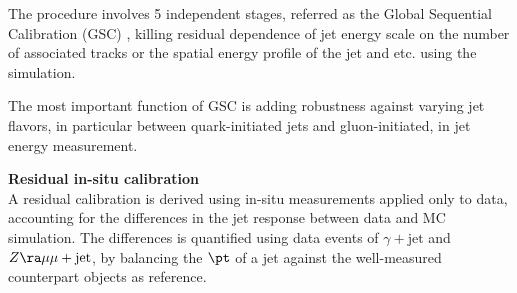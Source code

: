\begin{description}
The procedure involves 5 independent stages, referred as the Global Sequential Calibration (GSC) \cite{140_jetEneMeas_TCcalib}, killing residual dependence of jet energy scale on the number of associated tracks or the spatial energy profile of the jet and etc. using the simulation. 

The most important function of GSC is adding robustness against varying jet flavors, in particular between quark-initiated jets and gluon-initiated, in jet energy measurement.






\item \textbf{Residual in-situ calibration} \\
A residual calibration is derived using in-situ measurements applied only to data, accounting for the differences in the jet response between data and MC simulation.
The differences is quantified using data events of $\gamma+\mathrm{jet}$ and $Z\ra \mu\mu + \mathrm{jet}$,
by balancing the $\pt$ of a jet against the well-measured counterpart objects as reference.

\end{description}




